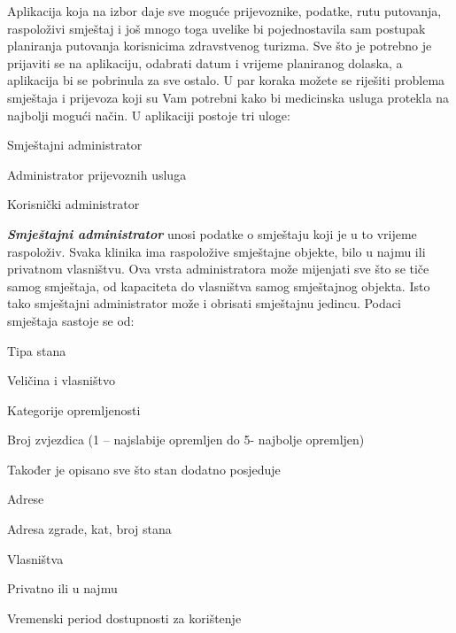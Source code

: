 		{Aplikacija koja na izbor daje sve moguće prijevoznike, podatke, rutu putovanja, raspoloživi smještaj i još mnogo toga uvelike bi pojednostavila sam postupak planiranja putovanja korisnicima zdravstvenog turizma. Sve što je potrebno je prijaviti se na aplikaciju, odabrati datum i vrijeme planiranog dolaska, a aplikacija bi se pobrinula za sve ostalo. U par koraka možete se riješiti problema smještaja i prijevoza koji su Vam potrebni kako bi medicinska usluga protekla na najbolji mogući način. }
		{U aplikaciji postoje tri uloge:}
		
		\begin{packed_item}
			\item Smještajni administrator
			\item Administrator prijevoznih usluga
			\item Korisnički administrator
		\end{packed_item}
		
		{\textbf{\textit{Smještajni administrator}} unosi podatke o smještaju koji je u to vrijeme raspoloživ. Svaka klinika ima raspoložive smještajne objekte, bilo u najmu ili privatnom vlasništvu. Ova vrsta administratora može mijenjati sve što se tiče samog smještaja, od kapaciteta do vlasništva samog smještajnog objekta. Isto tako smještajni administrator može i obrisati smještajnu jedincu. Podaci smještaja sastoje se od:}
		\begin{packed_item}
			\item Tipa stana
			\begin{packed_item}
				\item Veličina i vlasništvo
			\end{packed_item}
			
			\item Kategorije opremljenosti
			\begin{packed_item}
				\item Broj zvjezdica (1 – najslabije opremljen do 5- najbolje opremljen)
				\item Također je opisano sve što stan dodatno posjeduje
			\end{packed_item}
			
			\item Adrese
			\begin{packed_item}
				\item Adresa zgrade, kat, broj stana
			\end{packed_item}
			
			\item Vlasništva
			\begin{packed_item}
				\item Privatno ili u najmu
			\end{packed_item}
			
			\item Vremenski period dostupnosti za korištenje
		\end{packed_item}		
		
